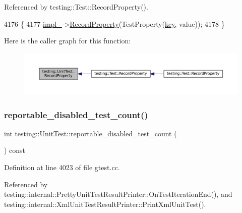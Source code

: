 Referenced by testing\+::\+Test\+::\+Record\+Property().


\begin{DoxyCode}
4176                                                       \{
4177   \hyperlink{classtesting_1_1UnitTest_a834685f92009d21b21a7307f4cbfb6e5}{impl\_}->\hyperlink{classtesting_1_1internal_1_1UnitTestImpl_a15e4af4df167d2504decbc8fcc108a6f}{RecordProperty}(TestProperty(\hyperlink{namespacekeyboard__server__node_af0ebd8a9e1564ddc13a227c727602466}{key}, value));
4178 \}
\end{DoxyCode}
Here is the caller graph for this function\+:
\nopagebreak
\begin{figure}[H]
\begin{center}
\leavevmode
\includegraphics[width=350pt]{classtesting_1_1UnitTest_a2c96a4a02c34095e07c6999e7686367f_icgraph}
\end{center}
\end{figure}
\mbox{\label{classtesting_1_1UnitTest_a2a2835db178d5c8569507db9f0a3d54f}} 
\subsubsection{\texorpdfstring{reportable\+\_\+disabled\+\_\+test\+\_\+count()}{reportable\_disabled\_test\_count()}}
{\footnotesize\ttfamily int testing\+::\+Unit\+Test\+::reportable\+\_\+disabled\+\_\+test\+\_\+count (\begin{DoxyParamCaption}{ }\end{DoxyParamCaption}) const}



Definition at line 4023 of file gtest.\+cc.



Referenced by testing\+::internal\+::\+Pretty\+Unit\+Test\+Result\+Printer\+::\+On\+Test\+Iteration\+End(), and testing\+::internal\+::\+Xml\+Unit\+Test\+Result\+Printer\+::\+Print\+Xml\+Unit\+Test().


